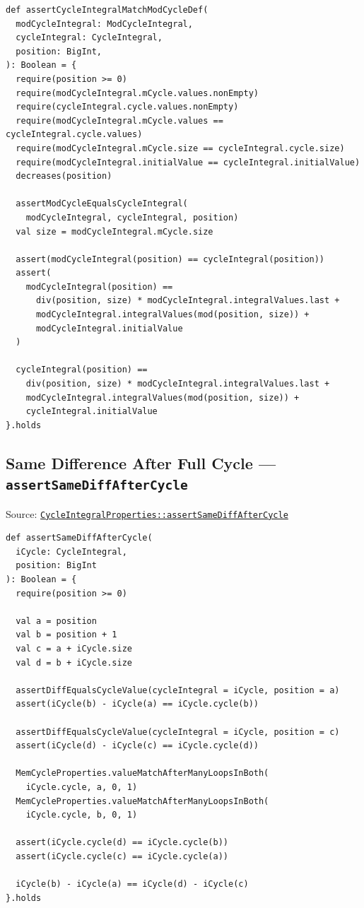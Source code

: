 \begin{lstlisting}[style=scala]
def assertCycleIntegralMatchModCycleDef(
  modCycleIntegral: ModCycleIntegral,
  cycleIntegral: CycleIntegral,
  position: BigInt,
): Boolean = {
  require(position >= 0)
  require(modCycleIntegral.mCycle.values.nonEmpty)
  require(cycleIntegral.cycle.values.nonEmpty)
  require(modCycleIntegral.mCycle.values == cycleIntegral.cycle.values)
  require(modCycleIntegral.mCycle.size == cycleIntegral.cycle.size)
  require(modCycleIntegral.initialValue == cycleIntegral.initialValue)
  decreases(position)

  assertModCycleEqualsCycleIntegral(
    modCycleIntegral, cycleIntegral, position)
  val size = modCycleIntegral.mCycle.size

  assert(modCycleIntegral(position) == cycleIntegral(position))
  assert(
    modCycleIntegral(position) ==
      div(position, size) * modCycleIntegral.integralValues.last +
      modCycleIntegral.integralValues(mod(position, size)) +
      modCycleIntegral.initialValue
  )

  cycleIntegral(position) ==
    div(position, size) * modCycleIntegral.integralValues.last +
    modCycleIntegral.integralValues(mod(position, size)) +
    cycleIntegral.initialValue
}.holds
\end{lstlisting}

\subsection{Same Difference After Full Cycle --- \texorpdfstring{\texttt{assert\allowbreak Same\allowbreak Diff\allowbreak After\allowbreak Cycle}}{assertSameDiffAfterCycle}}

{\raggedright Source: \href{https://github.com/thiagomata/prime-numbers/blob/integral-cycle-article-v1.0.0/src/main/scala/v1/chapter4/cycle/integral/recursive/properties/CycleIntegralProperties.scala}{\texttt{Cycle\allowbreak Integral\allowbreak Properties::assert\allowbreak Same\allowbreak Diff\allowbreak After\allowbreak Cycle}}\par}

\begin{lstlisting}[style=scala]
def assertSameDiffAfterCycle(
  iCycle: CycleIntegral,
  position: BigInt
): Boolean = {
  require(position >= 0)

  val a = position
  val b = position + 1
  val c = a + iCycle.size
  val d = b + iCycle.size

  assertDiffEqualsCycleValue(cycleIntegral = iCycle, position = a)
  assert(iCycle(b) - iCycle(a) == iCycle.cycle(b))

  assertDiffEqualsCycleValue(cycleIntegral = iCycle, position = c)
  assert(iCycle(d) - iCycle(c) == iCycle.cycle(d))

  MemCycleProperties.valueMatchAfterManyLoopsInBoth(
    iCycle.cycle, a, 0, 1)
  MemCycleProperties.valueMatchAfterManyLoopsInBoth(
    iCycle.cycle, b, 0, 1)

  assert(iCycle.cycle(d) == iCycle.cycle(b))
  assert(iCycle.cycle(c) == iCycle.cycle(a))

  iCycle(b) - iCycle(a) == iCycle(d) - iCycle(c)
}.holds
\end{lstlisting}

